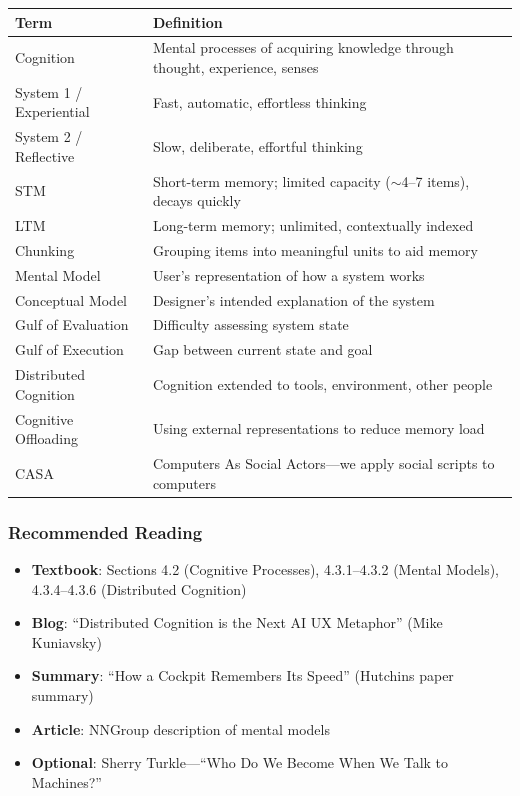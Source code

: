 \begin{center}
\renewcommand{\arraystretch}{1.3}
\begin{tabular}{@{} l p{8cm} @{}}
\toprule
\textbf{Term} & \textbf{Definition} \\
\midrule
Cognition & Mental processes of acquiring knowledge through thought, experience, senses \\
System 1 / Experiential & Fast, automatic, effortless thinking \\
System 2 / Reflective & Slow, deliberate, effortful thinking \\
STM & Short-term memory; limited capacity ($\sim$4--7 items), decays quickly \\
LTM & Long-term memory; unlimited, contextually indexed \\
Chunking & Grouping items into meaningful units to aid memory \\
Mental Model & User's representation of how a system works \\
Conceptual Model & Designer's intended explanation of the system \\
Gulf of Evaluation & Difficulty assessing system state \\
Gulf of Execution & Gap between current state and goal \\
Distributed Cognition & Cognition extended to tools, environment, other people \\
Cognitive Offloading & Using external representations to reduce memory load \\
CASA & Computers As Social Actors---we apply social scripts to computers \\
\bottomrule
\end{tabular}
\end{center}

\subsubsection*{Recommended Reading}
\begin{itemize}
  \item \textbf{Textbook}: Sections 4.2 (Cognitive Processes), 4.3.1--4.3.2 (Mental Models), 4.3.4--4.3.6 (Distributed Cognition)
  \item \textbf{Blog}: ``Distributed Cognition is the Next AI UX Metaphor'' (Mike Kuniavsky)
  \item \textbf{Summary}: ``How a Cockpit Remembers Its Speed'' (Hutchins paper summary)
  \item \textbf{Article}: NNGroup description of mental models
  \item \textbf{Optional}: Sherry Turkle---``Who Do We Become When We Talk to Machines?''
\end{itemize}


